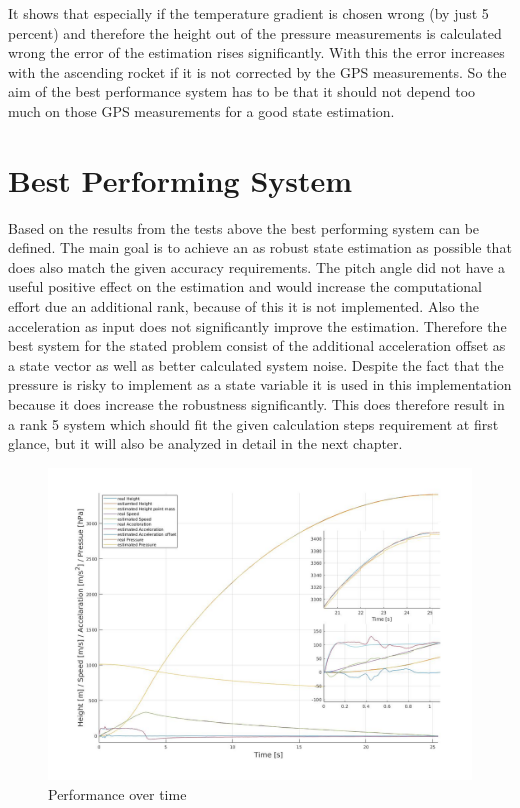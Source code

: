 It shows that especially if the temperature gradient is chosen wrong (by just 5 percent) and
therefore the height out of the pressure measurements is calculated wrong the error of the estimation rises significantly.
With this the error increases with the ascending rocket if it is not corrected by the GPS measurements.
So the aim of the best performance system has to be that it should not depend too much on those GPS measurements for a good state estimation.

\newpage
\section{Best Performing System}
Based on the results from the tests above the best performing system can be defined.
The main goal is to achieve an as robust state estimation as possible that does also match the given accuracy requirements.
The pitch angle did not have a useful positive effect on the estimation and would increase the computational effort due an additional rank, because of this it is not implemented.
Also the acceleration as input does not significantly improve the estimation.
Therefore the best system for the stated problem consist of the additional acceleration offset as a state vector as well as better calculated system noise.
Despite the fact that the pressure is risky to implement as a state variable it is used in this implementation because it does increase the robustness significantly.
This does therefore result in a rank 5 system which should fit the given calculation steps requirement at first glance, but it will also be analyzed in detail in the next chapter.

\begin{figure}[h!]
 \centering
 \includegraphics[width=.8\textwidth]{./Pictures/BestSystemPerformance.jpg}
 \caption{Performance over time}
 \label{fig:BestSystemPerformance}
\end{figure}

